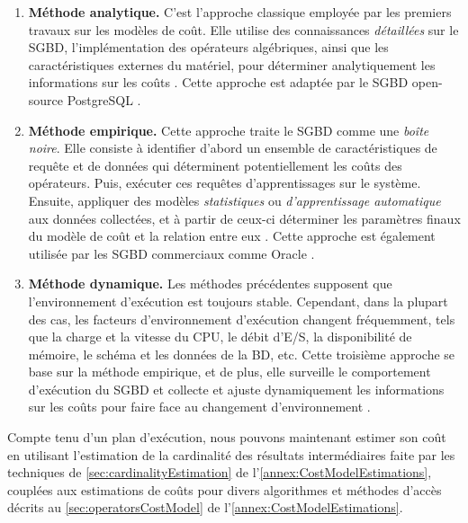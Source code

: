\begin{enumerate}
 \item \textbf{Méthode analytique.} C'est l'approche classique employée par les premiers travaux sur les modèles de coût. Elle utilise des connaissances \textit{détaillées} sur le SGBD, l'implémentation des opérateurs algébriques, ainsi que les caractéristiques externes du matériel, pour déterminer analytiquement les informations sur les coûts \cite{Selinger79,Graefe93,Haas97}. Cette approche est adaptée par le SGBD open-source PostgreSQL \cite{Wu13b}.
 \item \textbf{Méthode empirique.} Cette approche traite le SGBD comme une \textit{boîte noire}. Elle consiste à identifier d'abord un ensemble de caractéristiques de requête et de données qui déterminent potentiellement les coûts des opérateurs. Puis, exécuter ces requêtes d'apprentissages sur le système. Ensuite, appliquer des modèles \textit{statistiques} ou \textit{d'apprentissage automatique} aux données collectées, et à partir de ceux-ci déterminer les paramètres finaux du modèle de coût et la relation entre eux \cite{Wu13,Ganapathi09,Li12a}. Cette approche est également utilisée par les SGBD commerciaux comme Oracle \cite{Chakkappen08}.
 \item \textbf{Méthode dynamique.} Les méthodes précédentes supposent que l'environnement d'exécution est toujours stable. Cependant, dans la plupart des cas, les facteurs d'environnement d'exécution changent fréquemment, tels que la charge et la vitesse du CPU, le débit d'E/S, la disponibilité de mémoire, le schéma et les données de la BD, etc. Cette troisième approche se base sur la méthode empirique, et de plus, elle surveille le comportement d'exécution du SGBD et collecte et ajuste dynamiquement les informations sur les coûts pour faire face au changement d'environnement \cite{Duan09,Sheikh11,Khattab13}.
\end{enumerate}


Compte tenu d'un plan d'exécution, nous pouvons maintenant estimer son coût en utilisant l'estimation de la cardinalité des résultats intermédiaires faite par les techniques de \ref{sec:cardinalityEstimation} de l'\ref{annex:CostModelEstimations}, couplées aux estimations de coûts pour divers algorithmes et méthodes d'accès décrits au \ref{sec:operatorsCostModel} de l'\ref{annex:CostModelEstimations}.

